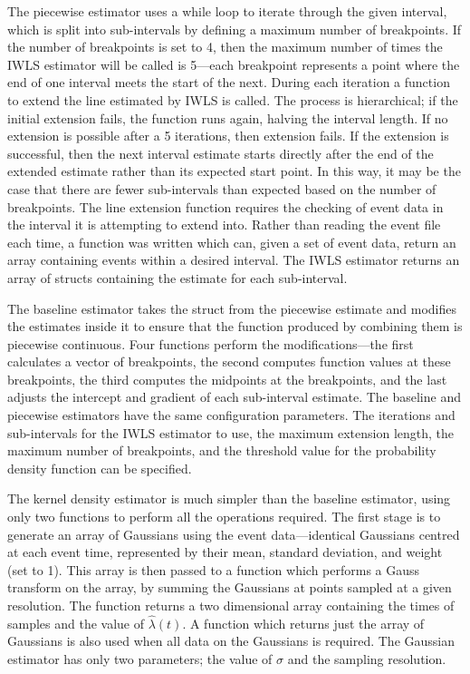 \documentclass[a4paper,11pt]{article}
\begin{document}
   The piecewise estimator uses a while loop to iterate through the given
   interval, which is split into sub-intervals by defining a maximum number of
   breakpoints. If the number of breakpoints is set to 4, then the maximum
   number of times the IWLS estimator will be called is 5---each breakpoint
   represents a point where the end of one interval meets the start of the
   next. During each iteration a function to extend the line estimated by IWLS
   is called. The process is hierarchical; if the initial extension fails, the
   function runs again, halving the interval length. If no extension is possible
   after a 5 iterations, then extension fails. If the extension is successful,
   then the next interval estimate starts directly after the end of the extended
   estimate rather than its expected start point. In this way, it may be the
   case that there are fewer sub-intervals than expected based on the number of
   breakpoints. The line extension function requires the checking of event data
   in the interval it is attempting to extend into. Rather than reading the
   event file each time, a function was written which can, given a set of event
   data, return an array containing events within a desired interval. The IWLS
   estimator returns an array of structs containing the estimate for each
   sub-interval.

   The baseline estimator takes the struct from the piecewise estimate and
   modifies the estimates inside it to ensure that the function produced by
   combining them is piecewise continuous. Four functions perform the
   modifications---the first calculates a vector of breakpoints, the second
   computes function values at these breakpoints, the third computes the
   midpoints at the breakpoints, and the last adjusts the intercept and gradient
   of each sub-interval estimate. The baseline and piecewise estimators have the
   same configuration parameters. The iterations and sub-intervals for the IWLS
   estimator to use, the maximum extension length, the maximum number of
   breakpoints, and the threshold value for the probability density function can
   be specified.

   The kernel density estimator is much simpler than the baseline estimator,
   using only two functions to perform all the operations required. The first
   stage is to generate an array of Gaussians using the event data---identical
   Gaussians centred at each event time, represented by their mean, standard
   deviation, and weight (set to 1). This array is then passed to a function
   which performs a Gauss transform on the array, by summing the Gaussians at
   points sampled at a given resolution. The function returns a two dimensional
   array containing the times of samples and the value of $\hat{\lambda}(t)$. A
   function which returns just the array of Gaussians is also used when all data
   on the Gaussians is required. The Gaussian estimator has only two parameters;
   the value of $\sigma$ and the sampling resolution.
\end{document}
